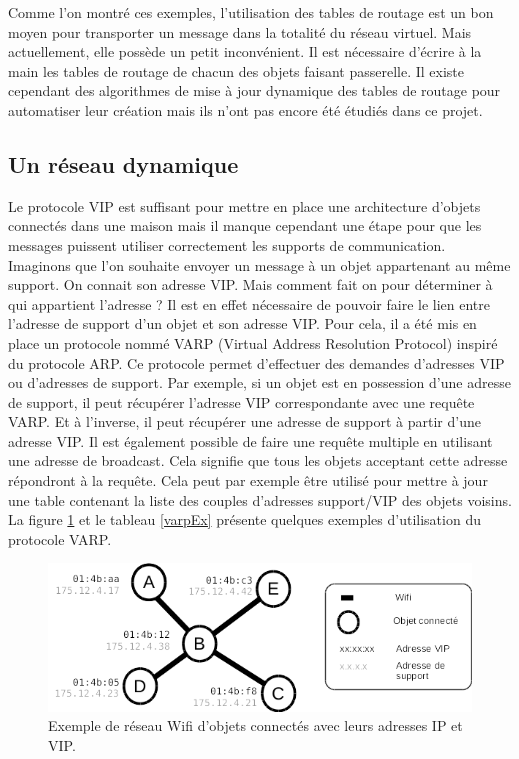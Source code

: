 			Comme l'on montré ces exemples, l'utilisation des tables de routage est un bon moyen pour
			transporter un message dans la totalité du réseau virtuel. Mais actuellement, elle possède
			un petit inconvénient. Il est nécessaire d'écrire à la main les tables de routage de 
			chacun des objets faisant passerelle. Il existe cependant des algorithmes de mise à jour 
			dynamique des tables de routage pour automatiser leur création mais ils n'ont pas encore 
			été étudiés dans ce projet.

	\subsection{Un réseau dynamique}
		Le protocole VIP est suffisant pour mettre en place une architecture d'objets connectés dans
		une maison mais il manque cependant une étape pour que les messages puissent utiliser
		correctement les supports de communication. Imaginons que l'on souhaite envoyer un message 
		à un objet appartenant au même support. On connait son adresse VIP. Mais comment 
		fait on pour déterminer à qui appartient l'adresse ? Il est en effet nécessaire de pouvoir 
		faire le lien entre l'adresse de support d'un objet et son adresse VIP. Pour cela, il a été
		mis en place un protocole nommé VARP (Virtual Address Resolution Protocol) inspiré du
		protocole ARP. Ce protocole permet d'effectuer des demandes d'adresses VIP ou d'adresses de
		support. Par exemple, si un objet est en possession d'une adresse de support, il peut
		récupérer l'adresse VIP correspondante avec une requête VARP. Et à l'inverse, il peut
		récupérer une adresse de support à partir d'une adresse VIP. Il est également possible de
		faire une requête multiple en utilisant une adresse de broadcast. Cela signifie que tous les
		objets acceptant cette adresse répondront à la requête. Cela peut par exemple être utilisé
		pour mettre à jour une table contenant la liste des couples d'adresses support/VIP des objets
		voisins. La figure \ref{varpNet} et le tableau \ref{varpEx} présente quelques exemples 
		d'utilisation du protocole VARP.
		
		\begin{figure}[!ht]
			\centering
			\includegraphics[width=\textwidth]{img/varp_net.png}
			\caption{Exemple de réseau Wifi d'objets connectés avec leurs adresses IP et VIP.}
			\label{varpNet}
		\end{figure}
		
